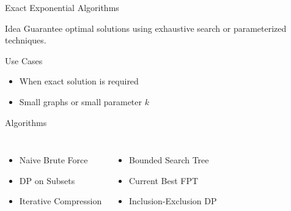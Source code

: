 \documentclass[aspectratio=169]{beamer}
\begin{document}
\begin{frame}{Exact Exponential Algorithms}

\begin{block}{Idea}
Guarantee optimal solutions using exhaustive search or parameterized techniques.
\end{block}

\vspace{0.2cm}

\begin{exampleblock}{Use Cases}
\begin{itemize}
\item When exact solution is required
\item Small graphs or small parameter $k$
\end{itemize}
\end{exampleblock}

\vspace{0.2cm}

\begin{alertblock}{Algorithms}

\begin{columns}[T] %
\begin{itemize}
\item Naive Brute Force
\item DP on Subsets
\item Iterative Compression
\end{itemize}

\begin{itemize}
\item Bounded Search Tree
\item Current Best FPT
\item Inclusion-Exclusion DP
\end{itemize}

\end{columns}

\end{alertblock}

\end{frame}
\end{document}
